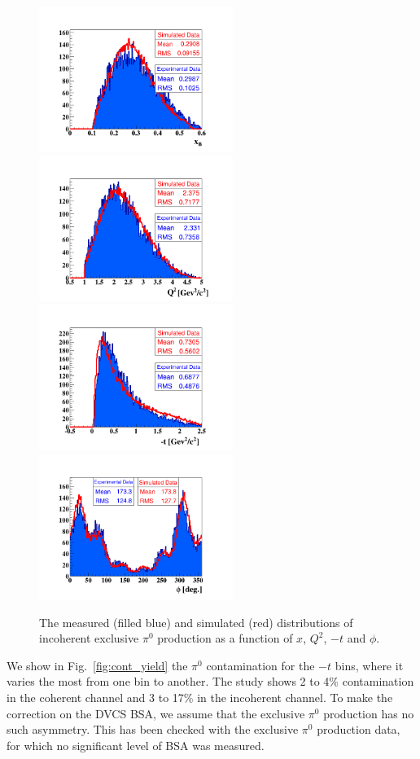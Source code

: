 \documentclass[aps,prc,preprint,superscriptaddress]{revtex4}
\begin{document}
\begin{figure}[p]
\center
\includegraphics[trim=70 15 70 70,clip,width=6.3cm]{fig3/pi0/xB_InCoh_pi0.png}
\includegraphics[trim=70 15 70 70,clip,width=6.3cm]{fig3/pi0/Q2_InCoh_pi0.png}
\includegraphics[trim=70 15 70 70,clip,width=6.3cm]{fig3/pi0/t_InCoh_pi0.png}
\includegraphics[trim=70 15 70 70,clip,width=6.3cm]{fig3/pi0/phi_h_InCoh_pi0.png}
	\caption{The measured (filled blue) and simulated (red) distributions of
	incoherent exclusive $\pi^0$ production as a function of $x$, $Q^2$, $-t$ and $\phi$.}
\label{fig:InCohPi0Simul}
\end{figure}


We show in Fig.~\ref{fig:cont_yield} the $\pi^0$ contamination for the $-t$ bins, where it varies
the most from one bin to another. The study
shows 2 to 4\% contamination in the coherent channel and 3 to 17\% in the incoherent
channel. To make the correction on the DVCS BSA, we assume that
the exclusive $\pi^0$ production has no such asymmetry. This has been checked with the exclusive 
$\pi^0$ production data, for which no significant level of BSA was measured.
\end{document}
